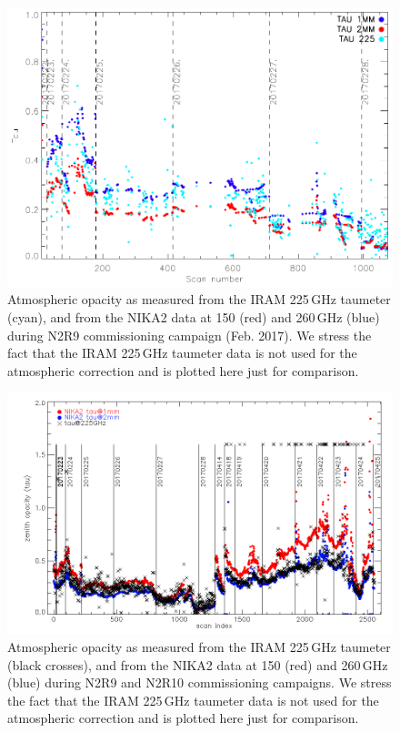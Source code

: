 \begin{figure}[ht]
\begin{center}
\includegraphics[scale=0.8]{../../../Paper_NIKA2_Technical/opacity_evol_run22.pdf}
\caption[Zenith opacity monitoring during N2R9]{Atmospheric opacity as measured from the IRAM 225\,GHz taumeter
(cyan), and from the NIKA2 data at 150 (red) and 260\,GHz (blue) during N2R9
commissioning campaign (Feb. 2017). We stress the fact that the IRAM 225\,GHz
taumeter data is not used for the atmospheric correction and is plotted here
just for comparison.
  \label{fig:taumeas_paper}}
\end{center}
\end{figure}


\begin{figure}[ht]
\begin{center}
\includegraphics[width=\linewidth]{Figures/opacity_vs_index_N2R9_N2R10.png}
\caption[Zenith opacity monitoring during N2R9 and N2R10]{Atmospheric opacity as measured from the IRAM 225\,GHz
  taumeter (black crosses), and from the NIKA2 data at 150 (red) and 260\,GHz (blue) during 
  N2R9 and N2R10 commissioning campaigns.  We stress the fact that the IRAM 225\,GHz taumeter data is not used for the atmospheric correction and is plotted here just for comparison.
  \label{fig:taumeas}}
\end{center}
\end{figure}


